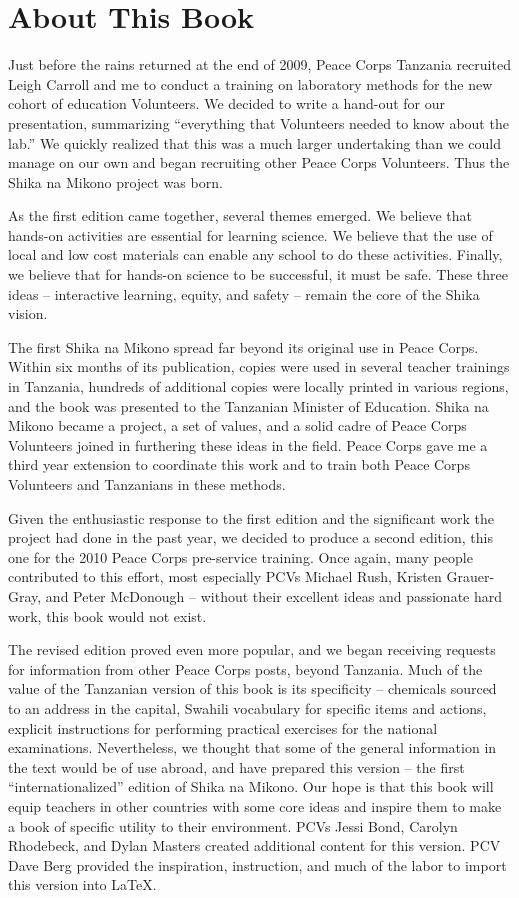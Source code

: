 \chapter{About This Book}

Just before the rains returned at the end of 2009, 
Peace Corps Tanzania recruited Leigh Carroll and me 
to conduct a training on laboratory methods 
for the new cohort of education Volunteers. 
We decided to write a hand-out for our presentation, 
summarizing ``everything that Volunteers needed to know about the lab.'' 
We quickly realized that this was a much larger undertaking 
than we could manage on our own 
and began recruiting other Peace Corps Volunteers. 
Thus the Shika na Mikono project was born.

As the first edition came together, several themes emerged. 
We believe that hands-on activities are essential for learning science. 
We believe that the use of local and low cost materials 
can enable any school to do these activities. 
Finally, we believe that for hands-on science to be successful, 
it must be safe. 
These three ideas -- interactive learning, equity, and safety -- 
remain the core of the Shika vision.

The first Shika na Mikono spread far beyond 
its original use in Peace Corps. 
Within six months of its publication, 
copies were used in several teacher trainings in Tanzania, 
hundreds of additional copies were locally printed in various regions, 
and the book was presented to the Tanzanian Minister of Education. 
Shika na Mikono became a project, a set of values, 
and a solid cadre of Peace Corps Volunteers 
joined in furthering these ideas in the field. 
Peace Corps gave me a third year extension to 
coordinate this work and to train both Peace Corps Volunteers 
and Tanzanians in these methods.

Given the enthusiastic response to the first edition 
and the significant work the project had done in the past year, 
we decided to produce a second edition, 
this one for the 2010 Peace Corps pre-service training. 
Once again, many people contributed to this effort, 
most especially PCVs Michael Rush, Kristen Grauer-Gray, and Peter McDonough 
-- without their excellent ideas and passionate hard work, 
this book would not exist.

The revised edition proved even more popular, 
and we began receiving requests for information 
from other Peace Corps posts, beyond Tanzania. 
Much of the value of the Tanzanian version of this book 
is its specificity -- 
chemicals sourced to an address in the capital, 
Swahili vocabulary for specific items and actions, 
explicit instructions for performing practical exercises 
for the national examinations. 
Nevertheless, we thought that some of the general information 
in the text would be of use abroad, 
and have prepared this version -- 
the first ``internationalized'' edition of Shika na Mikono. 
Our hope is that this book will equip teachers in other countries 
with some core ideas and inspire them to make 
a book of specific utility to their environment. 
PCVs Jessi Bond, Carolyn Rhodebeck, and Dylan Masters 
created additional content for this version. 
PCV Dave Berg provided the inspiration, instruction, 
and much of the labor to import this version into \LaTeX.

